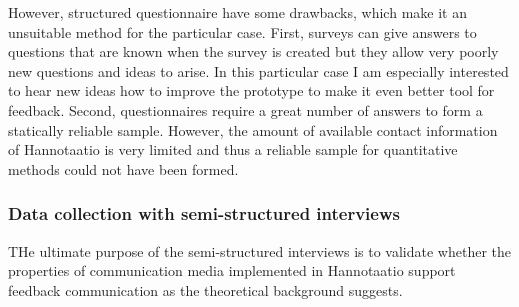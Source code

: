 \documentclass[english,12pt,a4paper,pdftex]{article}
\begin{document}
However, structured questionnaire have some drawbacks, which make it an unsuitable method for the particular case. First, surveys can give answers to questions that are known when the survey is created but they allow very poorly new questions and ideas to arise. In this particular case I am especially interested to hear new ideas how to improve the prototype to make it even better tool for feedback. Second, questionnaires require a great number of answers to form a statically reliable sample. However, the amount of available contact information of Hannotaatio is very limited and thus a reliable sample for quantitative methods could not have been formed.

\subsubsection{Data collection with semi-structured interviews}

THe ultimate purpose of the semi-structured interviews is to validate whether the properties of communication media implemented in Hannotaatio support feedback communication as the theoretical background suggests. 

\citep{silverman2009doing}

\end{document}
